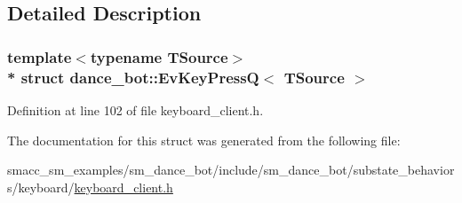 \subsection{Detailed Description}
\subsubsection*{template$<$typename T\+Source$>$\\*
struct dance\+\_\+bot\+::\+Ev\+Key\+Press\+Q$<$ T\+Source $>$}



Definition at line 102 of file keyboard\+\_\+client.\+h.



The documentation for this struct was generated from the following file\+:\begin{DoxyCompactItemize}
\item 
smacc\+\_\+sm\+\_\+examples/sm\+\_\+dance\+\_\+bot/include/sm\+\_\+dance\+\_\+bot/substate\+\_\+behaviors/keyboard/\hyperlink{keyboard__client_8h}{keyboard\+\_\+client.\+h}\end{DoxyCompactItemize}
